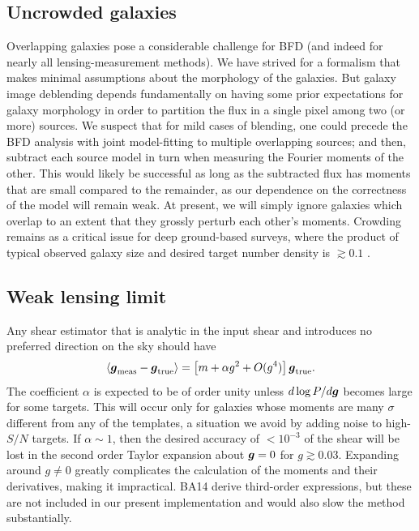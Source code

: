 \documentclass[11pt,preprint,flushrt]{aastex}
\newcommand{\vecg}{\mbox{\boldmath $g$}}
\newcommand\edit[1]{#1}
\begin{document}
\subsection{Uncrowded galaxies}
Overlapping galaxies pose a considerable challenge for BFD (and indeed
for nearly all lensing-measurement methods).  We have strived for a
formalism that makes minimal assumptions about the morphology of the
galaxies.  But galaxy image deblending depends fundamentally on having
some prior expectations for galaxy morphology in order to partition
the flux in a single pixel among two (or more) sources.  We suspect
that for mild cases of blending, one could precede the BFD analysis
with joint model-fitting to multiple overlapping sources; and then,
subtract each source model in turn when measuring the Fourier moments
of the other.  This would likely be successful as long as the
subtracted flux has moments that are small compared to the remainder,
as our dependence on the correctness of the model will remain weak.
At present, we will simply ignore galaxies which overlap to an
extent that they grossly perturb each other's moments.  Crowding
remains as a critical issue for deep ground-based surveys, where the
product of typical observed galaxy size and desired target number
density is $\gtrsim 0.1$ \citep{chihway}.


\subsection{Weak lensing limit}
\label{weaklimit}
Any shear estimator that is analytic in the input shear and introduces no
preferred direction on the sky should have 
\begin{equation}
\label{nonlin}
\left\langle \vecg_{\rm meas} - \vecg_{\rm true} \right\rangle = \left[m +
\alpha g^2 + O(g^4)\right] \vecg_{\rm true}.
\end{equation}
\edit{The coefficient $\alpha$ is expected to be of order unity unless
$d\log P/d\vecg$ becomes large for some targets.  This will occur only
for galaxies whose moments are many $\sigma$ different from any of the
templates, a situation we avoid by adding noise to high-$S/N$
targets.  If $\alpha\sim 1$, then the desired accuracy of $<10^{-3}$
of the shear will be lost in
the second order Taylor expansion about $\vecg=0$ for
$g \gtrsim 0.03$.}
Expanding around $g \ne 0$
greatly complicates the calculation of the moments and their derivatives, making
it impractical.  BA14 derive third-order expressions, but these are
not included in our present implementation and would also slow the
method substantially.
\end{document}
